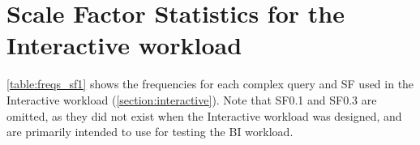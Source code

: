 \section{Scale Factor Statistics for the Interactive workload}\label{appendix:scale_factors}

\autoref{table:freqs_sf1} shows the frequencies for each complex query and SF used in the Interactive workload (\autoref{section:interactive}). Note that SF0.1 and SF0.3 are omitted, as they did not exist when the Interactive workload was designed, and are primarily intended to use for testing the BI workload.




